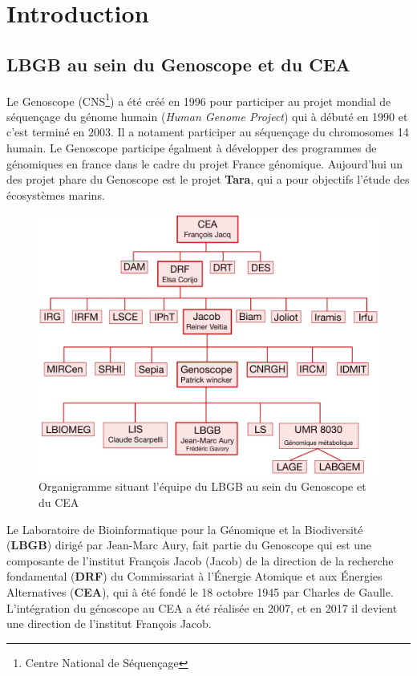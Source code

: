 \section{Introduction}
\subsection{LBGB au sein du Genoscope et du CEA}
Le Genoscope (CNS\footnote{Centre National de Séquençage}) a été créé en 1996 pour participer au projet mondial de séquençage du génome humain (\emph{Human Genome Project}) qui à débuté en 1990 et c'est terminé en 2003. Il a notament participer au séquençage du chromosomes 14 humain. Le Genoscope participe égalment à développer des programmes de génomiques en france dans le cadre du projet France génomique. Aujourd'hui un des projet phare du Genoscope est le projet \textbf{Tara}, qui a pour objectifs l'étude des écosystèmes marins.

\begin{minipage}{0.40\textwidth}
\begin{figure}[H]
    \centering
    \includegraphics[width=1\textwidth]{img/organigramme.jpg}
    \caption{Organigramme situant l’équipe du LBGB au sein du Genoscope et du CEA}
    \label{organigramme_LBGB}
\end{figure}
\end{minipage} 
\hfill
\begin{minipage}{0.5\textwidth}
    Le Laboratoire de Bioinformatique pour la Génomique et la Biodiversité (\textbf{LBGB}) dirigé par Jean-Marc Aury, fait partie du Genoscope qui est une composante de l'institut François Jacob (Jacob) de la direction de la recherche fondamental (\textbf{DRF}) du Commissariat à l'Énergie Atomique et aux Énergies Alternatives (\textbf{CEA}), qui à été fondé le 18 octobre 1945 par Charles de Gaulle. L'intégration du génoscope au CEA a été réalisée en 2007, et en 2017 il devient une direction de l'institut François Jacob.
\end{minipage}

